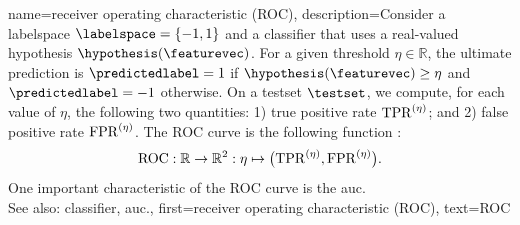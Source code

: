 {name={receiver operating characteristic (ROC)}, 
	description={Consider a \gls{labelspace} $\labelspace=\{-1,1\}$ and a \gls{classifier} 
 		that uses a real-valued \gls{hypothesis} $\hypothesis(\featurevec)$. For a given 
 		threshold $\eta \in \mathbb{R}$, the ultimate \gls{prediction} is $\predictedlabel=1$ 
 		if $\hypothesis(\featurevec)\geq \eta$ and $\predictedlabel=-1$ otherwise. 
 		On a \gls{testset} $\testset$, we compute, for each value of $\eta$, 
		the following two quantities: 1) true positive rate ${\rm TPR}^{(\eta)}$; 
		and 2) false positive rate ${\rm FPR}^{(\eta)}$. 
 		The ROC curve is  
 		the following \gls{function} \cite{IntroROCFawcett}:
 		$${\rm ROC}: \mathbb{R} \rightarrow \mathbb{R}^{2}: \eta \mapsto \big({\rm TPR}^{(\eta)}, {\rm FPR}^{(\eta)} \big).$$ 
 	        One important characteristic of the ROC curve is the \gls{auc}.
	        \\ 
 		See also: \gls{classifier}, \gls{auc}.}, 
  	first={receiver operating characteristic (ROC)}, 
  	text={ROC}
}

